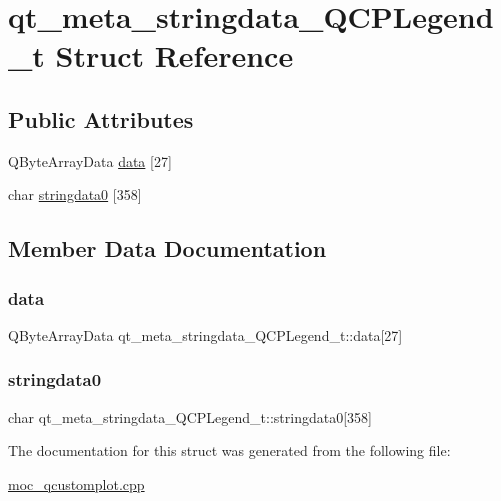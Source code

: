 \hypertarget{structqt__meta__stringdata__QCPLegend__t}{}\section{qt\+\_\+meta\+\_\+stringdata\+\_\+\+Q\+C\+P\+Legend\+\_\+t Struct Reference}
\label{structqt__meta__stringdata__QCPLegend__t}
\subsection*{Public Attributes}
\begin{DoxyCompactItemize}
\item 
Q\+Byte\+Array\+Data \mbox{\hyperlink{structqt__meta__stringdata__QCPLegend__t_ad8e758839b2e9818ac5f23a303aa99e7}{data}} \mbox{[}27\mbox{]}
\item 
char \mbox{\hyperlink{structqt__meta__stringdata__QCPLegend__t_ad3fb75c2831542ab8fdf3b1e50696a64}{stringdata0}} \mbox{[}358\mbox{]}
\end{DoxyCompactItemize}


\subsection{Member Data Documentation}
\mbox{\label{structqt__meta__stringdata__QCPLegend__t_ad8e758839b2e9818ac5f23a303aa99e7}} 
\subsubsection{\texorpdfstring{data}{data}}
{\footnotesize\ttfamily Q\+Byte\+Array\+Data qt\+\_\+meta\+\_\+stringdata\+\_\+\+Q\+C\+P\+Legend\+\_\+t\+::data\mbox{[}27\mbox{]}}

\mbox{\label{structqt__meta__stringdata__QCPLegend__t_ad3fb75c2831542ab8fdf3b1e50696a64}} 
\subsubsection{\texorpdfstring{stringdata0}{stringdata0}}
{\footnotesize\ttfamily char qt\+\_\+meta\+\_\+stringdata\+\_\+\+Q\+C\+P\+Legend\+\_\+t\+::stringdata0\mbox{[}358\mbox{]}}



The documentation for this struct was generated from the following file\+:\begin{DoxyCompactItemize}
\item 
\mbox{\hyperlink{moc__qcustomplot_8cpp}{moc\+\_\+qcustomplot.\+cpp}}\end{DoxyCompactItemize}
